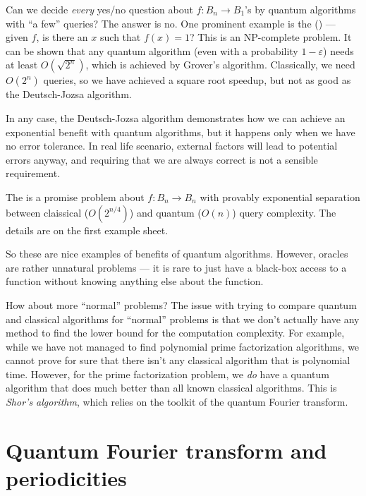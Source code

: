 \documentclass[a4paper]{article}
\begin{document}
Can we decide \emph{every} yes/no question about $f: B_n \to B_1$'s by quantum algorithms with ``a few'' queries? The answer is no. One prominent example is the  () --- given $f$, is there an $x$ such that $f(x) = 1$? This is an NP-complete problem. It can be shown that any quantum algorithm (even with a probability $1 - \varepsilon$) needs at least $O(\sqrt{2^n})$, which is achieved by Grover's algorithm. Classically, we need $O(2^n)$ queries, so we have achieved a square root speedup, but not as good as the Deutsch-Jozsa algorithm.

In any case, the Deutsch-Jozsa algorithm demonstrates how we can achieve an exponential benefit with quantum algorithms, but it happens only when we have no error tolerance. In real life scenario, external factors will lead to potential errors anyway, and requiring that we are always correct is not a sensible requirement.

\begin{eg}
  The  is a promise problem about $f: B_n \to B_n$ with provably exponential separation between claissical ($O(2^{n/4})$) and quantum ($O(n)$) query complexity. The details are on the first example sheet.
\end{eg}

So these are nice examples of benefits of quantum algorithms. However, oracles are rather unnatural problems --- it is rare to just have a black-box access to a function without knowing anything else about the function.

How about more ``normal'' problems? The issue with trying to compare quantum and classical algorithms for ``normal'' problems is that we don't actually have any method to find the lower bound for the computation complexity. For example, while we have not managed to find polynomial prime factorization algorithms, we cannot prove for sure that there isn't any classical algorithm that is polynomial time. However, for the prime factorization problem, we \emph{do} have a quantum algorithm that does much better than all known classical algorithms. This is \emph{Shor's algorithm}, which relies on the toolkit of the quantum Fourier transform.

\section{Quantum Fourier transform and periodicities}
\end{document}
